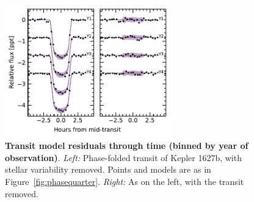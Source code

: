 \documentclass[12pt,modern,twocolumn,tighten]{aastex63}
\begin{document}
\begin{figure}[t]
	\begin{center}
		\leavevmode
		\includegraphics[width=0.64\textwidth]{f10.pdf}
	\end{center}
	\vspace{-0.7cm}
	\caption{
    {\bf Transit model residuals through time (binned by year of observation)}.  
    {\it Left:}
    Phase-folded transit of Kepler 1627b, with stellar variability
    removed.  Points and models are as in
    Figure~\ref{fig:phasequarter}.
    {\it Right:}
    As on the left, with the transit removed.
		\label{fig:phaseyear}
	}
\end{figure}
\end{document}
